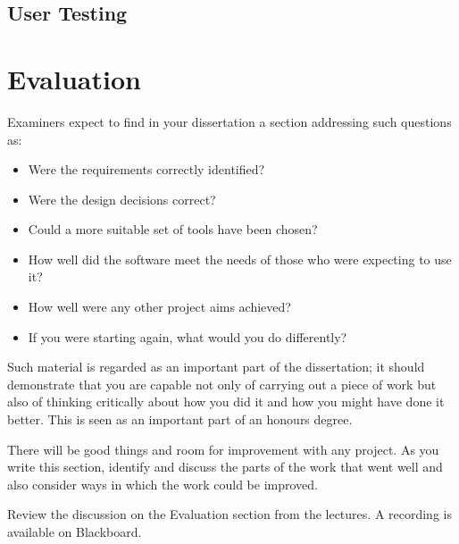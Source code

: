 \section{User Testing}

\chapter{Evaluation}

Examiners expect to find in your dissertation a section addressing such questions as:

\begin{itemize}
   \item Were the requirements correctly identified? 
   \item Were the design decisions correct?
   \item Could a more suitable set of tools have been chosen?
   \item How well did the software meet the needs of those who were expecting to use it?
   \item How well were any other project aims achieved?
   \item If you were starting again, what would you do differently?
\end{itemize}

Such material is regarded as an important part of the dissertation; it should demonstrate that you are capable not only of carrying out a piece of work but also of thinking critically about how you did it and how you might have done it better. This is seen as an important part of an honours degree. 

There will be good things and room for improvement with any project. As you write this section, identify and discuss the parts of the work that went well and also consider ways in which the work could be improved. 

Review the discussion on the Evaluation section from the lectures. A recording is available on Blackboard. 
